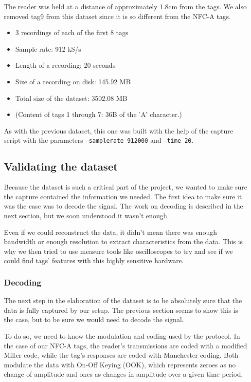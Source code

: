 The reader was held at a distance of approximately 1.8cm from the tags. We also removed tag9 from this dataset since it is so different from the NFC-A tags.

\begin{itemize}
  \item 3 recordings of each of the first 8 tags
  \item Sample rate: 912 kS/s
  \item Length of a recording: 20 seconds
  \item Size of a recording on disk: 145.92 MB
  \item Total size of the dataset: 3502.08 MB
  \item (Content of tags 1 through 7: 36B of the 'A' character.)
\end{itemize}

As with the previous dataset, this one was built with the help of the capture script with the parameters \texttt{--samplerate 912000} and \texttt{--time 20}.

\subsection{Validating the dataset} \label{validation}

Because the dataset is such a critical part of the project, we wanted to make sure the capture contained the information we needed. The first idea to make sure it was the case was to decode the signal. The work on decoding is described in the next section, but we soon understood it wasn't enough.

Even if we could reconstruct the data, it didn't mean there was enough bandwidth or enough resolution to extract characteristics from the data. This is why we then tried to use measure tools like oscilloscopes to try and see if we could find tags' features with this highly sensitive hardware.

\subsubsection{Decoding}

The next step in the elaboration of the dataset is to be absolutely sure that the data is fully captured by our setup. The previous section seems to show this is the case, but to be sure we would need to decode the signal.

To do so, we need to know the modulation and coding used by the protocol. In the case of our NFC-A tags, the reader's transmissions are coded with a modified Miller code, while the tag's responses are coded with Manchester coding. Both modulate the data with On-Off Keying (OOK), which represents zeroes as no change of amplitude and ones as changes in amplitude over a given time period. \cite{wiki_off_2020}

